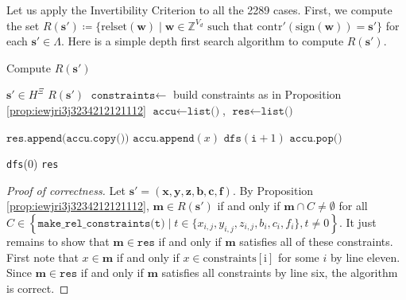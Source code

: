 Let us apply the Invertibility Criterion to all the 2289 cases. First, we compute the set \(  R(\mathbf{s}') \coloneqq \{ \mathrm{relset}(\mathbf{w}) \mid  \mathbf{w} \in \mathbb Z^{V_d} \text{ such that } \mathrm{contr}'(\mathrm{sign}(\mathbf{w})) = \mathbf{s}' \} \) for each \( \mathbf{s}' \in \Lambda \).
Here is a simple depth first search algorithm to compute \( R(\mathbf{s}') \).

\begin{algorithm}[H]
    \caption{Compute \( R(\mathbf{s}')  \)}
    \label{alg:relsets}
    \begin{algorithmic}[1]
    \Require $\mathbf{s}' \in H^{\Xi}$
    \Ensure $R(\mathbf{s}')$
        \State $\texttt{constraints} \gets$ build constraints as in Proposition \ref{prop:iewjri3j3234212121112}
        \State $\texttt{accu} \gets \texttt{list()}$, $\texttt{res} \gets \texttt{list()}$ 
        
                \State $\texttt{res.append(accu.copy())}$
                \State \Return
            \EndIf
                \State $\texttt{accu.append}(x)$
                \State $\texttt{dfs}(\texttt{i} + 1)$
                \State $\texttt{accu.pop()}$
            \EndFor
        \EndFunction
    
        \State \texttt{dfs}(0)
        \State \Return \texttt{res}
    \EndFunction
    \end{algorithmic}
    \end{algorithm}
    
    \begin{proof}[Proof of correctness]
        Let \( \mathbf{s}' = (\mathbf{x}, \mathbf{y}, \mathbf{z}, \mathbf{b}, \mathbf{c}, \mathbf{f}) \).
        By Proposition \ref{prop:iewjri3j3234212121112}, \( \mathbf{m} \in R(\mathbf{s}') \) if and only if \( \mathbf{m} \cap C \neq \emptyset \) for all \( C \in \left\{ \texttt{make\_rel\_constraints(t)} \mid t \in \{x_{i,j}, y_{i,j}, z_{i,j}, b_i, c_i, f_i\}, t \neq 0 \right\} \). It just remains to show that \( \mathbf{m} \in \texttt{res} \) if and only if \( \mathbf{m} \) satisfies all of these constraints. First note that \( x \in \mathbf{m} \) if and only if \( x \in \mathrm{constraints[i]} \) for some \( i \) by line eleven. Since \( \mathbf{m} \in \texttt{res}  \) if and only if \( \mathbf{m} \) satisfies all constraints by line six, the algorithm is correct.
    \end{proof}


